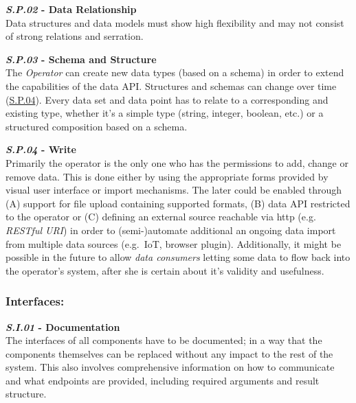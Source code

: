 \documentclass[12pt,english,a4paper,titlepage,cleardoublepage=empty,dottedtoc]{report}
\begin{document}
\textbf{\emph{\protect\hypertarget{sp02}{}{S.P.02}} - Data
Relationship}\\
Data structures and data models must show high flexibility and may not
consist of strong relations and serration.

\textbf{\emph{\protect\hypertarget{sp03}{}{S.P.03}} - Schema and
Structure}\\
The \emph{Operator} can create new data types (based on a schema) in
order to extend the capabilities of the data API. Structures and schemas
can change over time (\protect\hyperlink{sp04}{S.P.04}). Every data set
and data point has to relate to a corresponding and existing type,
whether it's a simple type (string, integer, boolean, etc.) or a
structured composition based on a schema.

\textbf{\emph{\protect\hypertarget{sp04}{}{S.P.04}} - Write}\\
Primarily the operator is the only one who has the permissions to add,
change or remove data. This is done either by using the appropriate
forms provided by visual user interface or import mechanisms. The later
could be enabled through (A) support for file upload containing
supported formats, (B) data API restricted to the operator or (C)
defining an external source reachable via http (e.g. \emph{RESTful URI})
in order to (semi-)automate additional an ongoing data import from
multiple data sources (e.g.~IoT, browser plugin). Additionally, it might
be possible in the future to allow \emph{data consumers} letting some
data to flow back into the operator's system, after she is certain about
it's validity and usefulness.

\subsubsection{Interfaces:}\label{interfaces}

\textbf{\emph{\protect\hypertarget{si01}{}{S.I.01}} - Documentation}\\
The interfaces of all components have to be documented; in a way that
the components themselves can be replaced without any impact to the rest
of the system. This also involves comprehensive information on how to
communicate and what endpoints are provided, including required
arguments and result structure.
\end{document}
